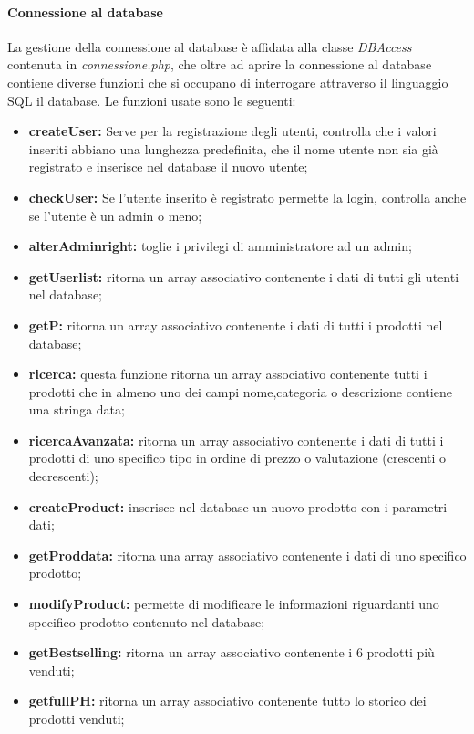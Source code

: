 \paragraph{Connessione al database} \Spazio
La gestione della connessione al database è affidata alla classe \emph{DBAccess} contenuta in \textit{connessione.php}, che oltre ad aprire la connessione al database contiene diverse funzioni che si occupano di interrogare attraverso il linguaggio SQL il database. \newline
Le funzioni usate sono le seguenti:
\begin{itemize}
	\item \textbf{createUser:} Serve per la registrazione degli utenti, controlla che i valori inseriti abbiano una lunghezza predefinita, che il nome utente non sia già registrato e inserisce nel database il nuovo utente;
	\item \textbf{checkUser:} Se l'utente inserito è registrato permette la login, controlla anche se l'utente è un admin o meno;
	\item \textbf{alterAdminright:} toglie i privilegi di amministratore ad un admin;
	\item \textbf{getUserlist:} ritorna un array associativo contenente i dati di tutti gli utenti nel database;
	\item \textbf{getP:} ritorna un array associativo contenente i dati di tutti i prodotti nel database;
	\item \textbf{ricerca:} questa funzione ritorna un array associativo contenente tutti i prodotti che in almeno uno dei campi nome,categoria o descrizione contiene una stringa data; 
	\item \textbf{ricercaAvanzata:} ritorna un array associativo contenente i dati di tutti i prodotti di uno specifico tipo in ordine di prezzo o valutazione (crescenti o decrescenti);
	\item \textbf{createProduct:} inserisce nel database un nuovo prodotto con i parametri dati;
	\item \textbf{getProddata:} ritorna una array associativo contenente i dati di uno specifico prodotto;
	\item \textbf{modifyProduct:} permette di modificare le informazioni riguardanti uno specifico prodotto contenuto nel database;
	\item \textbf{getBestselling:} ritorna un array associativo contenente i 6 prodotti più venduti; 
	\item \textbf{getfullPH:} ritorna un array associativo contenente tutto lo storico dei prodotti venduti;

\end{itemize}
